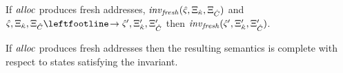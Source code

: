 \begin{lemma}
  If $\mathit{alloc}$ produces fresh addresses, $\mathit{inv}_{\mathit{fresh}}(\hat\varsigma,\Xi_{\hat{\kappa}},\Xi_{\hat{C}})$ and
$\mastate,\mktab_{\makont},\mktab_{\mamkont} \stepto
\mastate',\mktab'_{\makont},\mktab'_{\mamkont}$ then
$\mathit{inv}_{\mathit{fresh}}(\hat\varsigma',\Xi'_{{\hat{\kappa}}},\Xi'_{{\hat{C}}})$.
\end{lemma}
\begin{theorem}
  If $\mathit{alloc}$ produces fresh addresses then the resulting semantics is complete with respect to states satisfying the invariant.
\end{theorem}

